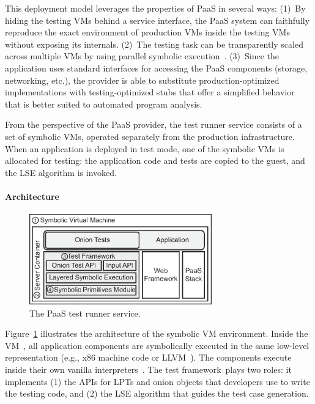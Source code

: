 This deployment model leverages the properties of PaaS in several
ways:
%
(1)~By hiding the testing VMs behind a service interface, the PaaS system can faithfully reproduce the exact environment of production VMs inside the testing VMs without exposing its internals.
%
(2)~The testing task can be transparently scaled across multiple VMs
by using parallel symbolic execution~\cite{cloud9}.
%
(3)~Since the application uses standard interfaces for accessing the PaaS components (storage, networking, etc.), the provider is able to substitute production-optimized implementations with testing-optimized stubs that offer a simplified behavior that is better suited to automated program analysis.

From the perspective of the PaaS provider, the test runner service consists of a set of symbolic VMs, operated separately from the production infrastructure.  When an application is deployed in test mode, one of the symbolic VMs is allocated for testing: the application code and tests are copied to the guest, and the LSE algorithm is invoked.

\paragraph{Architecture}

\begin{figure}
  \centering
  \includegraphics[width=3.1in]{paas/figures/symbolic-vm}
  \caption{The PaaS test runner service.}
  \label{fig:fse}
\end{figure}

Figure~\ref{fig:fse} illustrates the architecture of the symbolic VM
environment.  Inside the VM~\cI, all application components are
symbolically executed in the same low-level representation (e.g., x86
machine code or LLVM~\cite{llvm}).  The components execute inside
their own vanilla interpreters~\cII.  
%
The test framework~\cIII plays two roles: it implements (1) the APIs for LPTs and onion objects that developers use to write the testing code, and (2) the LSE algorithm that guides the test case generation.

